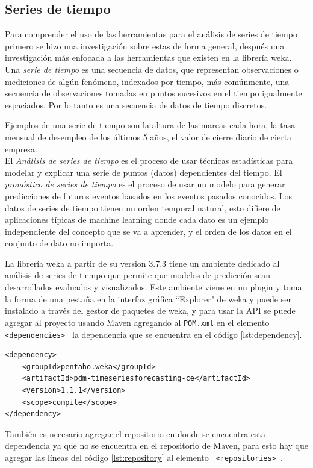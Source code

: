 \subsection{Series de tiempo} \label{subsec:estudiost}
Para comprender el uso de las herramientas para el análisis de series de tiempo primero se hizo una investigación sobre estas de forma general, después una investigación más enfocada a las herramientas que existen en la librería weka.\\
Una \textit{serie de tiempo} es una secuencia de datos, que representan observaciones o
mediciones de algún fenómeno, indexados por tiempo, más comúnmente, una
secuencia de observaciones tomadas en puntos sucesivos en el tiempo igualmente
espaciados. Por lo tanto es una secuencia de datos de tiempo discretos. 

Ejemplos de una serie de tiempo son la altura de las mareas cada hora, la tasa mensual de
desempleo de los últimos 5 años, el valor de cierre diario de cierta empresa.\\
El \textit{Análisis de series de tiempo} es el proceso de usar técnicas estadísticas para modelar y explicar una serie de puntos (datos) dependientes del tiempo. El \textit{pronóstico de series de tiempo} es el proceso
de  usar un modelo para generar predicciones de futuros eventos basados en los eventos pasados conocidos.
Los datos de series de tiempo tienen un orden temporal natural, esto difiere de aplicaciones típicas de 
machine learning donde cada dato es un ejemplo independiente del concepto que se va a aprender, y el orden
de los datos en el conjunto de dato no importa. 

La librería weka a partir de su version 3.7.3 tiene un ambiente dedicado al análisis de series de tiempo que permite que modelos de predicción sean desarrollados evaluados y visualizados. Este ambiente viene en un plugin y toma la forma de una pestaña en la interfaz gráfica ``Explorer" de weka y puede ser instalado a través del gestor de paquetes de weka, y para usar la API se puede agregar al proyecto usando Maven agregando al \texttt{POM.xml} en el elemento {\tt \lstinline$ <dependencies>$ } la dependencia que se encuentra en el código \ref{lst:dependency}.
\begin{lstlisting}[frame=single]  
<dependency>
	<groupId>pentaho.weka</groupId>
	<artifactId>pdm-timeseriesforecasting-ce</artifactId>
	<version>1.1.1</version>
	<scope>compile</scope>
</dependency>
\end{lstlisting} 
También es necesario agregar el repositorio en donde se encuentra esta dependencia ya que no se encuentra en el repositorio de Maven, para esto hay que agregar las líneas del código \ref{lst:repository} al elemento  {\tt \lstinline$ <repositories>$ }. 

